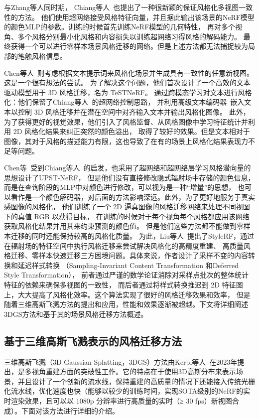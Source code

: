 \par 与Zhang等人同时期， Chiang等人~\cite{chiang2022stylizing}也提出了一种很新颖的保证风格化多视图一致性的方法。
他们使用超网络接受风格特征向量，并且据此输出该场景的NeRF模型的颜色MLP的参数。训练的时候首先训练NeRF模型的几何特性，
再对多个视角、多个风格分别最小化风格和内容损失以训练超网络习得风格的解码能力。
最终获得一个可以进行零样本场景风格迁移的网络。但是上述方法都无法捕捉较为局部的笔触风格信息。

\par Chen等人~\cite{chen2023testnerf}则考虑根据文本提示词来风格化场景并生成具有一致性的任意新视图。这是一个很有想法的尝试。
为了解决这个问题，他们首次设计了一个高效的文本驱动模型用于 3D 风格迁移，名为 TeSTNeRF。
通过跨模态学习对文本进行风格化：他们保留了Chiang等人~\cite{chiang2022stylizing}的超网络控制思路，
并利用高级文本编码器~\cite{radford2021learning}嵌入文本以控制 3D 风格迁移并在潜在空间中对齐输入文本并输出风格化图像。
此外，为了获得更好的视觉效果，他们引入了风格监督、从风格图像中学习特征统计并利用 2D 风格化结果来纠正突然的颜色溢出，
取得了较好的效果。但是文本相对于图像，其对于风格的描述能力有限，这也导致了在有的场景上风格化结果表现力不足等问题。

\par Chen等~\cite{chen2024upst}受到Chiang等人~\cite{chiang2022stylizing}的启发，也采用了超网络和超网络层学习风格潜向量的思想设计了UPST-NeRF，
但是他们没有直接修改隐式辐射场中存储的颜色信息，而是在查询阶段的MLP中对颜色进行修改，可以视为是一种“增量”的思想，
也可以看作是一个颜色解码器，对后面的方法影响深远。此外，为了更好地服务于真实感图像的风格化，
他们训练了一个 2D 逼真图像的风格迁移网络来处理不同视图下的真值 RGB 以获得目标，
在训练的时候对于每个视角每个风格都应用该网络获取风格化结果并用其来约束预测的颜色值。
但是他们这些方法都不能做到零样本迁移的同时还能保持较高的风格化质量。
为此，Liu等人~\cite{liu2023stylerf}提出了StyleRF，通过在辐射场的特征空间中执行风格迁移来尝试解决风格化的高精度重建、
高质量风格迁移、零样本快速迁移三方困境问题。具体来说，作者设计了采样不变的内容转换和延迟样式转换
（Sampling-Invariant Content Transformation 和Deferred Style Transformation），
前者通过严谨的数学论证消除对采样点批次的整体统计特征的依赖来确保多视图的一致性，
而后者通过将样式转换推迟到 2D 特征图上，大大提高了风格化效率。这个算法实现了很好的风格迁移效果和效率，
但是随着三维高斯飞溅方法的提出和应用，性能和效果逐渐被超越。下文将详细阐述3DGS方法和基于其的场景风格迁移方法概述。


\subsection{基于三维高斯飞溅表示的风格迁移方法}
三维高斯飞溅（3D Gaussian Splatting，3DGS）方法由Kerbl等人~\cite{kerbl20233d}在2023年提出，是多视角重建方面的突破性工作。它的特点在于使用3D高斯分布来表示场景，并且设计了一个创新的流水线，保持重建的高质量的情况下还能接入传统光栅化流水线，优化速度也快（能够以较少的训练时间，实现SOTA级别的NeRF的实时渲染效果，且可以以 1080p 分辨率进行高质量的实时（≥ 30 fps）新视图合成）。下面对该方法进行详细的介绍。

